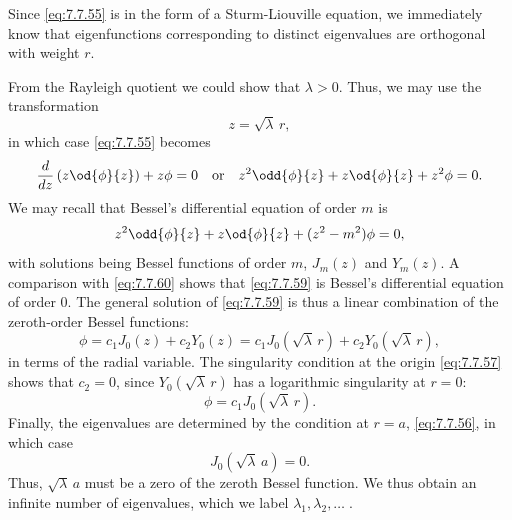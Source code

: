 Since \eqref{eq:7.7.55} is in the form of a Sturm-Liouville equation, we immediately know that eigenfunctions corresponding to distinct eigenvalues are orthogonal with weight $r$.

From the Rayleigh quotient we could show that $\lambda > 0$.  Thus, we may use the transformation
\begin{equation}
z = \sqrt{\lambda}\,r,
\label{eq:7.7.58}
\end{equation}
in which case \eqref{eq:7.7.55} becomes
\begin{equation}
\frac{d}{d z}\left(z\od{\phi}{z}\right) + z\phi = 0 \quad\text{or}\quad z^2\odd{\phi}{z} + z\od{\phi}{z} + z^2\phi = 0.
\label{eq:7.7.59}
\end{equation}
We may recall that Bessel's differential equation of order $m$ is
\begin{equation}
z^2\odd{\phi}{z} + z\od{\phi}{z} + (z^2 - m^2)\phi = 0,
\label{eq:7.7.60}
\end{equation}
with solutions being Bessel functions of order $m$, $J_m(z)$ and $Y_m(z)$.  A comparison with \eqref{eq:7.7.60} shows that \eqref{eq:7.7.59} is Bessel's differential equation of order 0.  The general solution of \eqref{eq:7.7.59} is thus a linear combination of the zeroth-order Bessel functions:
\begin{equation}
\phi = c_1 J_0(z) + c_2 Y_0(z) = c_1 J_0\left(\sqrt{\lambda}\,r\right) + c_2 Y_0\left(\sqrt{\lambda}\,r\right),
\label{eq:7.7.61}
\end{equation}
in terms of the radial variable.  The singularity condition at the origin \eqref{eq:7.7.57} shows that $c_2 = 0$, since $Y_0\left(\sqrt{\lambda}\,r\right)$ has a logarithmic singularity at $r = 0$:
\begin{equation}
\phi = c_1 J_0\left(\sqrt{\lambda}\,r\right).
\label{eq:7.7.62}
\end{equation}
Finally, the eigenvalues are determined by the condition at $r = a$, \eqref{eq:7.7.56}, in which case
\begin{equation}
J_0\left(\sqrt{\lambda}\,a\right) = 0.
\label{eq:7.7.63}
\end{equation}
Thus, $\sqrt{\lambda}\,a$ must be a zero of the zeroth Bessel function.  We thus obtain an infinite number of eigenvalues, which we label $\lambda_1, \lambda_2, \ldots\;$.

